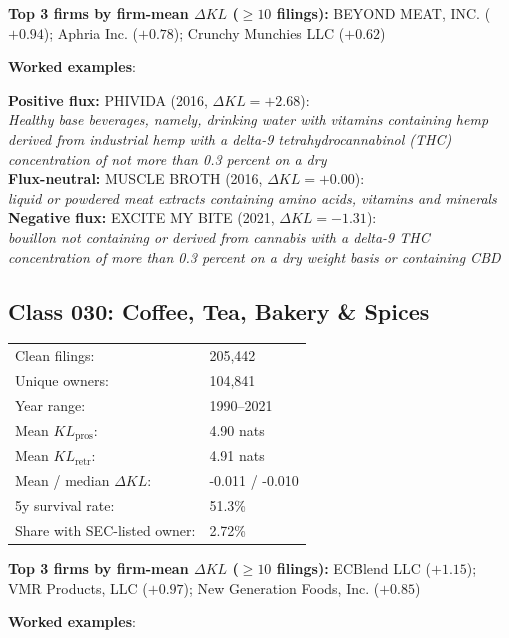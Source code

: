 \textbf{Top 3 firms by firm-mean $\Delta KL$ ($\geq 10$ filings):} BEYOND MEAT, INC. ($+0.94$); Aphria Inc. ($+0.78$); Crunchy Munchies LLC ($+0.62$)

\textbf{Worked examples}:

  \textbf{Positive flux:} \textsc{PHIVIDA} (2016, $\Delta KL=+2.68$):\\
  \textit{Healthy base beverages, namely, drinking water with vitamins containing hemp derived from industrial hemp with a delta-9 tetrahydrocannabinol (THC) concentration of not more than 0.3 percent on a dry }\\
  \textbf{Flux-neutral:} \textsc{MUSCLE BROTH} (2016, $\Delta KL=+0.00$):\\
  \textit{liquid or powdered meat extracts containing amino acids, vitamins and minerals}\\
  \textbf{Negative flux:} \textsc{EXCITE MY BITE} (2021, $\Delta KL=-1.31$):\\
  \textit{bouillon not containing or derived from cannabis with a delta-9 THC concentration of more than 0.3 percent on a dry weight basis or containing CBD}\\

\subsection*{Class 030: Coffee, Tea, Bakery \& Spices}
\label{app:industry-030}

\begin{tabular}{ll}
Clean filings: & 205,442 \\
Unique owners: & 104,841 \\
Year range: & 1990--2021 \\
Mean $KL_\text{pros}$: & 4.90 nats \\
Mean $KL_\text{retr}$: & 4.91 nats \\
Mean / median $\Delta KL$: & -0.011 / -0.010 \\
5y survival rate: & 51.3\% \\
Share with SEC-listed owner: & 2.72\% \\
\end{tabular}

\textbf{Top 3 firms by firm-mean $\Delta KL$ ($\geq 10$ filings):} ECBlend LLC ($+1.15$); VMR Products, LLC ($+0.97$); New Generation Foods, Inc. ($+0.85$)

\textbf{Worked examples}:

